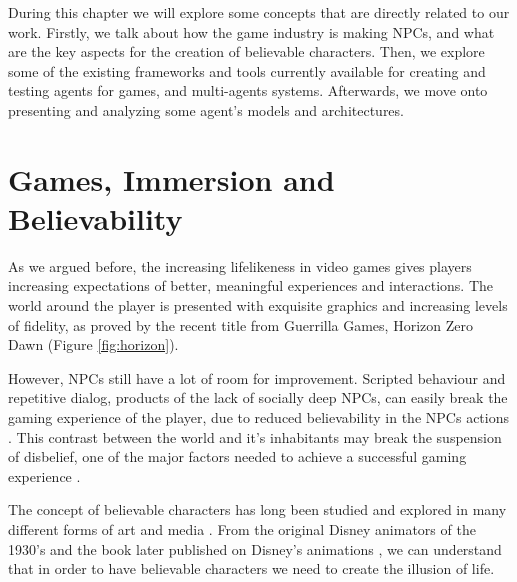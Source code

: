 \cleardoublepage
\label{chapter:related-work}

\noindent During this chapter we will explore some concepts that are directly related to our work.
Firstly, we talk about how the game industry is making \acp{NPC}, and what are the key aspects for the creation of believable characters.
Then, we explore some of the existing frameworks and tools currently available for creating and testing agents for games, and multi-agents systems.
Afterwards, we move onto presenting and analyzing some agent's models and architectures.

\section{Games, Immersion and Believability}

\noindent As we argued before, the increasing lifelikeness in video games gives players increasing expectations of better, meaningful experiences and interactions.
The world around the player is presented with exquisite graphics and increasing levels of fidelity, as proved by the recent title from Guerrilla Games, Horizon Zero Dawn \cite{games:horizon} (Figure \ref{fig:horizon}).

However, \acp{NPC} still have a lot of room for improvement.
Scripted behaviour and repetitive dialog, products of the lack of socially deep \acp{NPC}, can easily break the gaming experience of the player, due to reduced believability in the \acp{NPC} actions \cite{thrainsson:emotion-games}.
This contrast between the world and it's inhabitants may break the suspension of disbelief, one of the major factors needed to achieve a successful gaming experience \cite{ijsselsteijn:userexperience}.

The concept of believable characters has long been studied and explored in many different forms of art and media \cite{bates:emotioninagents}.
From the original Disney animators of the 1930's and the book later published on Disney's animations \cite{illusionoflife}, we can understand that in order to have believable characters we need to create the illusion of life.

